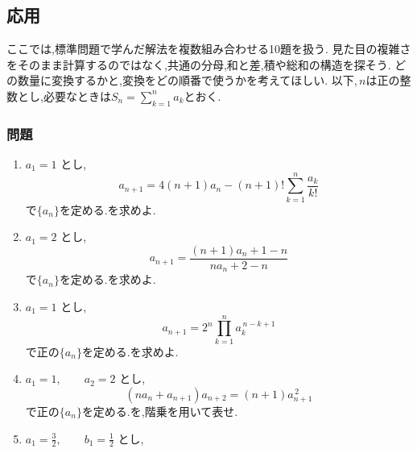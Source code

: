     \subsection{応用}\label{節：応用難易度}\label{節：高難易度のもの}
      ここでは,標準問題で学んだ解法を複数組み合わせる10題を扱う.
      見た目の複雑さをそのまま計算するのではなく,共通の分母,和と差,積や総和の構造を探そう.
      どの数量に変換するかと,変換をどの順番で使うかを考えてほしい.
      以下,\,$n$は正の整数とし,必要なときは$S_n=\sum_{k=1}^{n}a_k$とおく.

      \subsubsection{問題}\label{節：応用難易度：問題}\label{節：高難易度のもの：問題}
        \begin{enumerate}[label=\textbf{問\arabic*.},leftmargin=3.8em,format=\bookitemlink{practice-advanced}{problem}{answer}]
          \item $\displaystyle a_1=1$ とし,
                \[
                  a_{n+1}
                  =4(n+1)a_n
                    -(n+1)!\sum_{k=1}^{n}\frac{a_k}{k!}
                \]
                で$\{a_n\}$を定める.を求めよ.
          \item $\displaystyle a_1=2$ とし,
                \[
                  a_{n+1}
                   =\frac{(n+1)a_n+1-n}{na_n+2-n}
                \]
                で$\{a_n\}$を定める.を求めよ.
          \item $\displaystyle a_1=1$ とし,
                \[
                  a_{n+1}
                   =2^n\prod_{k=1}^{n}a_k^{\,n-k+1}
                \]
                で正の$\{a_n\}$を定める.を求めよ.
          \item $\displaystyle a_1=1,\qquad a_2=2$ とし,
                \[
                  (na_n+a_{n+1})a_{n+2}
                    =(n+1)a_{n+1}^{\,2}
                \]
                で正の$\{a_n\}$を定める.を,階乗を用いて表せ.
          \item $\displaystyle a_1=\frac32,\qquad b_1=\frac12$ とし,
                \begin{align*}

\end{align*}
\end{enumerate}
